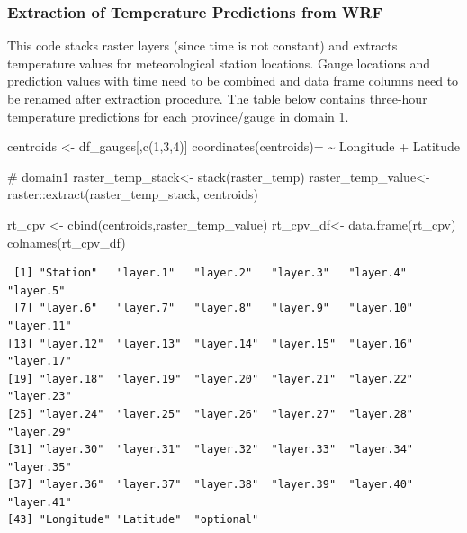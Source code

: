 \documentclass[
  letterpaper,
  DIV=11,
  numbers=noendperiod,
  abstract]{scrartcl}
\newenvironment{Shaded}{\begin{snugshade}}{\end{snugshade}}
\newcommand{\CommentTok}[1]{\textcolor[rgb]{0.37,0.37,0.37}{#1}}
\newcommand{\DecValTok}[1]{\textcolor[rgb]{0.68,0.00,0.00}{#1}}
\newcommand{\ErrorTok}[1]{\textcolor[rgb]{0.68,0.00,0.00}{#1}}
\newcommand{\FunctionTok}[1]{\textcolor[rgb]{0.28,0.35,0.67}{#1}}
\newcommand{\NormalTok}[1]{\textcolor[rgb]{0.00,0.23,0.31}{#1}}
\newcommand{\OtherTok}[1]{\textcolor[rgb]{0.00,0.23,0.31}{#1}}
\newcommand{\SpecialCharTok}[1]{\textcolor[rgb]{0.37,0.37,0.37}{#1}}
\begin{document}
\hypertarget{extraction-of-temperature-predictions-from-wrf}{%
\subsubsection{Extraction of Temperature Predictions from
WRF}\label{extraction-of-temperature-predictions-from-wrf}}

This code stacks raster layers (since time is not constant) and extracts
temperature values for meteorological station locations. Gauge locations
and prediction values with time need to be combined and data frame
columns need to be renamed after extraction procedure. The table below
contains three-hour temperature predictions for each province/gauge in
domain 1.

\begin{Shaded}
\begin{Highlighting}[]
\NormalTok{centroids }\OtherTok{\textless{}{-}}\NormalTok{ df\_gauges[,}\FunctionTok{c}\NormalTok{(}\DecValTok{1}\NormalTok{,}\DecValTok{3}\NormalTok{,}\DecValTok{4}\NormalTok{)]}
\FunctionTok{coordinates}\NormalTok{(centroids)}\OtherTok{=} \ErrorTok{\textasciitilde{}}\NormalTok{ Longitude }\SpecialCharTok{+}\NormalTok{ Latitude}

\CommentTok{\# domain1}
\NormalTok{raster\_temp\_stack}\OtherTok{\textless{}{-}} \FunctionTok{stack}\NormalTok{(raster\_temp)}
\NormalTok{raster\_temp\_value}\OtherTok{\textless{}{-}}\NormalTok{ raster}\SpecialCharTok{::}\FunctionTok{extract}\NormalTok{(raster\_temp\_stack, centroids)}

\NormalTok{rt\_cpv }\OtherTok{\textless{}{-}} \FunctionTok{cbind}\NormalTok{(centroids,raster\_temp\_value)}
\NormalTok{rt\_cpv\_df}\OtherTok{\textless{}{-}} \FunctionTok{data.frame}\NormalTok{(rt\_cpv)}
\FunctionTok{colnames}\NormalTok{(rt\_cpv\_df)}
\end{Highlighting}
\end{Shaded}

\begin{verbatim}
 [1] "Station"   "layer.1"   "layer.2"   "layer.3"   "layer.4"   "layer.5"  
 [7] "layer.6"   "layer.7"   "layer.8"   "layer.9"   "layer.10"  "layer.11" 
[13] "layer.12"  "layer.13"  "layer.14"  "layer.15"  "layer.16"  "layer.17" 
[19] "layer.18"  "layer.19"  "layer.20"  "layer.21"  "layer.22"  "layer.23" 
[25] "layer.24"  "layer.25"  "layer.26"  "layer.27"  "layer.28"  "layer.29" 
[31] "layer.30"  "layer.31"  "layer.32"  "layer.33"  "layer.34"  "layer.35" 
[37] "layer.36"  "layer.37"  "layer.38"  "layer.39"  "layer.40"  "layer.41" 
[43] "Longitude" "Latitude"  "optional" 
\end{verbatim}
\end{document}
